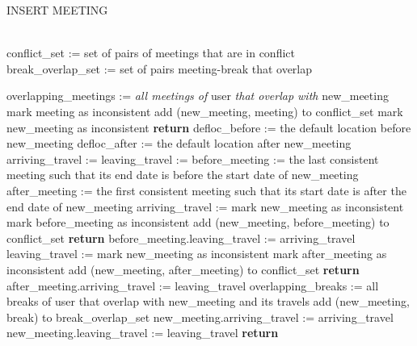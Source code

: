 \begin{algorithm}
\renewcommand\thealgorithm{}
\caption{INSERT MEETING}
\Variables \\
	conflict\_set := set of pairs of meetings that are in conflict \\
	break\_overlap\_set := set of pairs meeting-break that overlap
\State
	\begin{algorithmic}[1]
		\State overlapping\_meetings := \textit{all meetings of} user \textit{that overlap with} new\_meeting
			\State mark meeting as inconsistent
			\State add (new\_meeting, meeting) to conflict\_set
		\EndFor
			\State mark new\_meeting as inconsistent
			\State \textbf{return}
		\EndIf
		\State defloc\_before := the default location before new\_meeting
		\State defloc\_after := the default location after new\_meeting
		\State arriving\_travel := 
		\State leaving\_travel := 
		\State before\_meeting := the last consistent meeting such that its end date is before the start date of new\_meeting
		\State after\_meeting := the first consistent meeting such that its start date is after the end date of new\_meeting
		\Statex
			\State arriving\_travel := 
				\State mark new\_meeting as inconsistent
				\State mark before\_meeting as inconsistent
				\State add (new\_meeting, before\_meeting) to conflict\_set
				\State \textbf{return}	
			\Else
				\State before\_meeting.leaving\_travel := arriving\_travel			
			\EndIf
		\EndIf
		\Statex
			\State leaving\_travel := 
				\State mark new\_meeting as inconsistent
				\State mark after\_meeting as inconsistent
				\State add (new\_meeting, after\_meeting) to conflict\_set
				\State \textbf{return}	
			\Else
				\State after\_meeting.arriving\_travel := leaving\_travel					
			\EndIf
		\EndIf
		\Statex
		\State overlapping\_breaks := all breaks of user that overlap with new\_meeting and its travels
			\State {}
			\State add (new\_meeting, break) to break\_overlap\_set
		\EndFor
		\State new\_meeting.arriving\_travel := arriving\_travel
		\State new\_meeting.leaving\_travel := leaving\_travel
		\State \textbf{return}
	\end{algorithmic}
\addtocounter{algorithm}{-1}
\end{algorithm}

